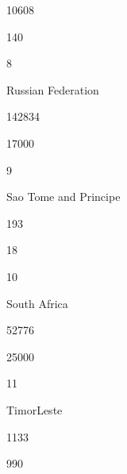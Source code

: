\documentclass[letterpaper,10pt,english]{sphinxmanual}
\begin{document}
10608





140









8





Russian Federation





142834





17000









9





Sao Tome and Principe





193





18









10





South Africa





52776





25000









11





Timor\sphinxhyphen{}Leste





1133





990
\end{document}
